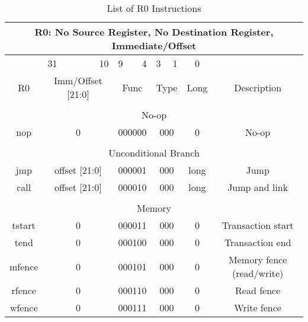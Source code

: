 \documentclass{article}
\begin{document}
    \begin{center}
    \begin{longtable}{|c|l|r|l|r|l|r|c|c|}
    \caption{List of R0 Instructions}
    \label{table:r0_instr} \\
    
                    \multicolumn{9}{c}{R0: No Source Register, No Destination Register, Immediate/Offset} \\
    \hline      &   \multicolumn{1}{l}{31}  &   10          &   \multicolumn{1}{l}{9}   &   4   &   \multicolumn{1}{l}{3}   &   1   &   0   & \\
    \hline R0   &   \multicolumn{2}{|c|}{Imm/Offset [21:0]} &   \multicolumn{2}{|c|}{Func}      &   \multicolumn{2}{|c|}{Type}  &   Long    &   Description \\
    
    
    \hline          \multicolumn{9}{|c|}{} \\
    
                    \multicolumn{9}{|c|}{No-op} \\
    \hline nop  &   \multicolumn{2}{|c|}{0}     &   \multicolumn{2}{|c|}{000000}    &   \multicolumn{2}{|c|}{000}   &   0   &   No-op \\
    
    
    \hline          \multicolumn{9}{|c|}{} \\
    
                    \multicolumn{9}{|c|}{Unconditional Branch} \\
    \hline jmp  &   \multicolumn{2}{|c|}{offset [21:0]}     &   \multicolumn{2}{|c|}{000001}    &   \multicolumn{2}{|c|}{000}   &   long    &   Jump \\
    \hline call &   \multicolumn{2}{|c|}{offset [21:0]}     &   \multicolumn{2}{|c|}{000010}    &   \multicolumn{2}{|c|}{000}   &   long    &   Jump and link \\
    
    
    \hline              \multicolumn{9}{|c|}{} \\
    
                        \multicolumn{9}{|c|}{Memory} \\
    \hline tstart   &   \multicolumn{2}{|c|}{0}     &   \multicolumn{2}{|c|}{000011}    &   \multicolumn{2}{|c|}{000}   &   0   &   Transaction start \\
    \hline tend     &   \multicolumn{2}{|c|}{0}     &   \multicolumn{2}{|c|}{000100}    &   \multicolumn{2}{|c|}{000}   &   0   &   Transaction end \\
    \hline mfence   &   \multicolumn{2}{|c|}{0}     &   \multicolumn{2}{|c|}{000101}    &   \multicolumn{2}{|c|}{000}   &   0   &   Memory fence (read/write) \\
    \hline rfence   &   \multicolumn{2}{|c|}{0}     &   \multicolumn{2}{|c|}{000110}    &   \multicolumn{2}{|c|}{000}   &   0   &   Read fence \\
    \hline wfence   &   \multicolumn{2}{|c|}{0}     &   \multicolumn{2}{|c|}{000111}    &   \multicolumn{2}{|c|}{000}   &   0   &   Write fence \\



\end{longtable}
\end{center}
\end{document}
